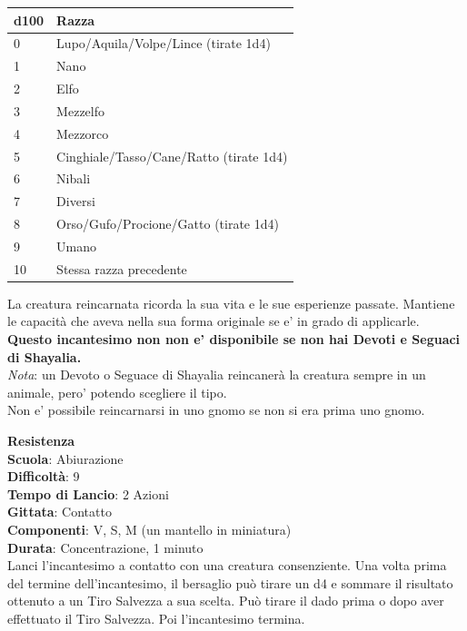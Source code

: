 \begin{multicols}{2}
\medskip
\begin{tabular}{ll}
\textbf{d100} &\textbf{Razza}\\
\toprule
0 & Lupo/Aquila/Volpe/Lince (tirate 1d4)\\
1&Nano\\
2&Elfo\\
3&Mezzelfo\\
4&Mezzorco\\
5&Cinghiale/Tasso/Cane/Ratto (tirate 1d4)\\
6&Nibali\\
7&Diversi\\
8&Orso/Gufo/Procione/Gatto (tirate 1d4)\\
9&Umano\\
10&Stessa razza precedente\\
\end{tabular}

La creatura reincarnata ricorda la sua vita e le sue esperienze passate. Mantiene le capacità che aveva nella sua forma originale se e' in grado di applicarle.\\
\textbf{Questo incantesimo non non e' disponibile se non hai Devoti e Seguaci di Shayalia.}\\
\textit{Nota}: un Devoto o Seguace di Shayalia reincanerà la creatura sempre in un animale, pero' potendo scegliere il tipo.\\
Non e' possibile reincarnarsi in uno gnomo se non si era prima uno gnomo.

\medskip\textbf{Resistenza}\\
\textbf{Scuola}: Abiurazione\\
\textbf{Difficoltà}: 9\\
\textbf{Tempo di Lancio}: 2 Azioni\\
\textbf{Gittata}: Contatto\\
\textbf{Componenti}: V, S, M (un mantello in miniatura)\\
\textbf{Durata}: Concentrazione, 1 minuto\\
Lanci l'incantesimo a contatto con una creatura consenziente. Una volta prima del termine dell'incantesimo, il bersaglio può tirare un d4 e sommare il risultato ottenuto a un Tiro Salvezza a sua scelta. Può tirare il dado prima o dopo aver effettuato il Tiro Salvezza. Poi l'incantesimo termina.


\end{multicols}
